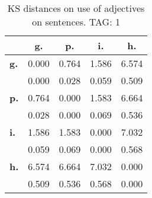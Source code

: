 \begin{table}[h!]
\begin{center}
\begin{tabular}{| l || c | c | c | c |}\hline
 & {\bf g.} & {\bf p.} & {\bf i.} & {\bf h.} \\\hline\hline
{\bf g.} & 0.000 & 0.764 & 1.586 & 6.574 \\
{\bf } & 0.000 & 0.028 & 0.059 & 0.509 \\\hline
{\bf p.} & 0.764 & 0.000 & 1.583 & 6.664 \\
{\bf } & 0.028 & 0.000 & 0.069 & 0.536 \\\hline
{\bf i.} & 1.586 & 1.583 & 0.000 & 7.032 \\
{\bf } & 0.059 & 0.069 & 0.000 & 0.568 \\\hline
{\bf h.} & 6.574 & 6.664 & 7.032 & 0.000 \\
{\bf } & 0.509 & 0.536 & 0.568 & 0.000 \\\hline
\end{tabular}
\caption{KS distances on use of adjectives on sentences. TAG: 1}
\end{center}
\end{table}